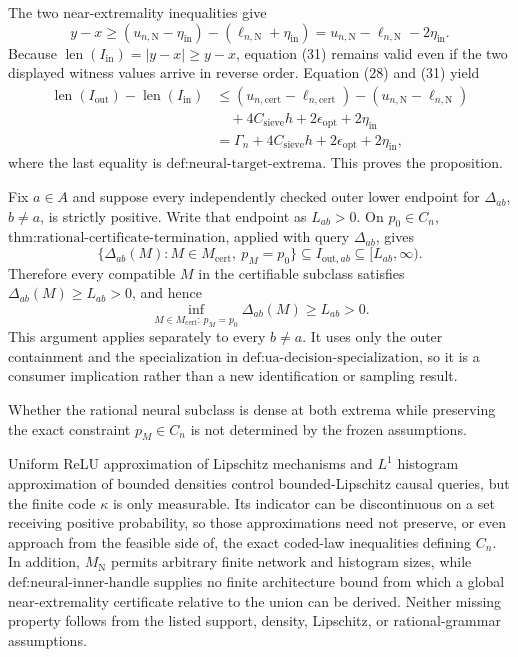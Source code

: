 The two near-extremality inequalities give
\[
y-x\geq (u_{n,\mathrm N}-\eta_{\mathrm{in}})
          -(\ell_{n,\mathrm N}+\eta_{\mathrm{in}})
=u_{n,\mathrm N}-\ell_{n,\mathrm N}-2\eta_{\mathrm{in}}.        \tag{31}
\]
Because \(\operatorname{len}(I_{\mathrm{in}})=|y-x|\geq y-x\), equation (31) remains valid even if the two displayed witness values arrive in reverse order.  Equation (28) and (31) yield
\[
\begin{aligned}
\operatorname{len}(I_{\mathrm{out}})-\operatorname{len}(I_{\mathrm{in}})
&\leq (u_{n,\mathrm{cert}}-\ell_{n,\mathrm{cert}})
      -(u_{n,\mathrm N}-\ell_{n,\mathrm N})\\
&\quad+4C_{\mathrm{sieve}}h+2\epsilon_{\mathrm{opt}}+2\eta_{\mathrm{in}}\\
&=\Gamma_n+4C_{\mathrm{sieve}}h+2\epsilon_{\mathrm{opt}}+2\eta_{\mathrm{in}},
\end{aligned}
\]
where the last equality is \(\text{def:neural-target-extrema}\).  This proves the proposition.

Fix \(a\in A\) and suppose every independently checked outer lower endpoint for \(\Delta_{ab}\), \(b\ne a\), is strictly positive.  Write that endpoint as \(L_{ab}>0\).  On \(p_0\in C_n\), \(\text{thm:rational-certificate-termination}\), applied with query \(\Delta_{ab}\), gives
\[
\{\Delta_{ab}(M):M\in M_{\mathrm{cert}},\ p_M=p_0\}\subseteq I_{\mathrm{out},ab}\subseteq[L_{ab},\infty).
\]
Therefore every compatible \(M\) in the certifiable subclass satisfies \(\Delta_{ab}(M)\geq L_{ab}>0\), and hence
\[
\inf_{M\in M_{\mathrm{cert}}:\,p_M=p_0}\Delta_{ab}(M)\geq L_{ab}>0.
\]
This argument applies separately to every \(b\ne a\).  It uses only the outer containment and the specialization in \(\text{def:ua-decision-specialization}\), so it is a consumer implication rather than a new identification or sampling result.

Whether the rational neural subclass is dense at both extrema while preserving the exact constraint \(p_M\in C_n\) is not determined by the frozen assumptions.

Uniform ReLU approximation of Lipschitz mechanisms and \(L^1\) histogram approximation of bounded densities control bounded-Lipschitz causal queries, but the finite code \(\kappa\) is only measurable.  Its indicator can be discontinuous on a set receiving positive probability, so those approximations need not preserve, or even approach from the feasible side of, the exact coded-law inequalities defining \(C_n\).  In addition, \(M_{\mathrm N}\) permits arbitrary finite network and histogram sizes, while \(\text{def:neural-inner-handle}\) supplies no finite architecture bound from which a global near-extremality certificate relative to the union can be derived.  Neither missing property follows from the listed support, density, Lipschitz, or rational-grammar assumptions.

